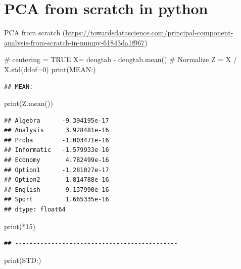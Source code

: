 \documentclass[
  10pt,
]{article}
\newenvironment{Shaded}{\begin{snugshade}}{\end{snugshade}}
\newcommand{\NormalTok}[1]{#1}
\begin{document}
\section{PCA from scratch in python}\label{pca-from-scratch-in-python}

PCA from scratch
(\url{https://towardsdatascience.com/principal-component-analysis-from-scratch-in-numpy-61843da1f967})

\begin{Shaded}
\begin{Highlighting}[]
\NormalTok{\# centering = TRUE}
\NormalTok{X= deugtab {-} deugtab.mean()}
\NormalTok{\# Normalize}
\NormalTok{Z = X / X.std(ddof=0)}
\NormalTok{print(\textquotesingle{}MEAN:\textquotesingle{})}
\end{Highlighting}
\end{Shaded}

\begin{verbatim}
## MEAN:
\end{verbatim}

\begin{Shaded}
\begin{Highlighting}[]
\NormalTok{print(Z.mean())}
\end{Highlighting}
\end{Shaded}

\begin{verbatim}
## Algebra      -9.394195e-17
## Analysis      3.928481e-16
## Proba        -1.003471e-16
## Informatic   -1.579933e-16
## Economy       4.782499e-16
## Option1      -1.281027e-17
## Option2       1.814788e-16
## English      -9.137990e-16
## Sport         1.665335e-16
## dtype: float64
\end{verbatim}

\begin{Shaded}
\begin{Highlighting}[]
\NormalTok{print(\textquotesingle{}{-}{-}{-}\textquotesingle{}*15)}
\end{Highlighting}
\end{Shaded}

\begin{verbatim}
## ---------------------------------------------
\end{verbatim}

\begin{Shaded}
\begin{Highlighting}[]
\NormalTok{print(\textquotesingle{}STD:\textquotesingle{})}
\end{Highlighting}
\end{Shaded}
\end{document}
